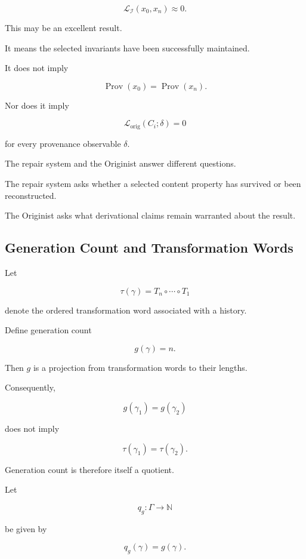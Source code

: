 \documentclass[
  11pt,
  a4paper,
  DIV=12,
  BCOR=0mm,
  parskip=half-
]{scrartcl}
\newcommand{\Inv}{\mathcal I}
\newcommand{\lossorig}{%
  \mathscr L_{\mathrm{orig}}%
}
\newcommand{\Prov}{\operatorname{Prov}}
\theoremstyle{definition}
\theoremstyle{plain}
\theoremstyle{remark}
\begin{document}
\[
  \mathcal L_{\Inv}(x_0,x_n)\approx 0.
\]

This may be an excellent result.

It means the selected invariants have been successfully maintained.

It does not imply

\[
  \Prov(x_0)=\Prov(x_n).
\]

Nor does it imply

\[
  \lossorig(C_i;\delta)=0
\]

for every provenance observable \(\delta\).

The repair system and the Originist answer different questions.

The repair system asks whether a selected content property has survived or
been reconstructed.

The Originist asks what derivational claims remain warranted about the result.


\subsection{Generation Count and Transformation Words}
\label{app:generation-summary}

Let

\[
  \tau(\gamma)
  =
  T_n\circ\cdots\circ T_1
\]

denote the ordered transformation word associated with a history.

Define generation count

\[
  g(\gamma)=n.
\]

Then \(g\) is a projection from transformation words to their lengths.

Consequently,

\[
  g(\gamma_1)=g(\gamma_2)
\]

does not imply

\[
  \tau(\gamma_1)=\tau(\gamma_2).
\]

Generation count is therefore itself a quotient.

Let

\[
  q_g:\Gamma\to\mathbb N
\]

be given by

\[
  q_g(\gamma)=g(\gamma).
\]
\end{document}

